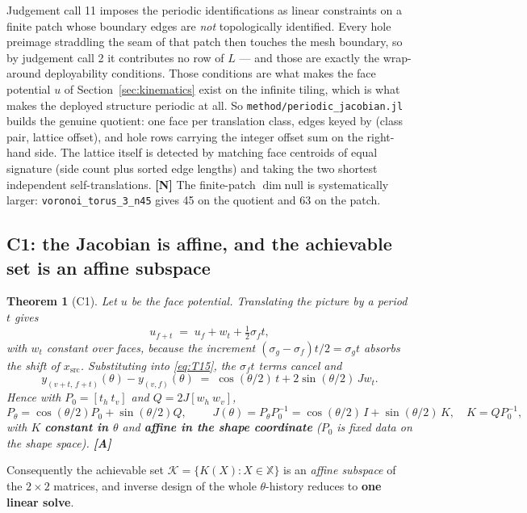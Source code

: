 \documentclass[11pt,a4paper]{article}
\newtheorem{theorem}{Theorem}[section]
\theoremstyle{definition}
\newcommand{\file}[1]{\texttt{\small #1}}
\begin{document}
Judgement call 11 imposes the periodic identifications as linear constraints on a finite patch
whose boundary edges are \emph{not} topologically identified. Every hole preimage straddling
the seam of that patch then touches the mesh boundary, so by judgement call 2 it contributes
no row of $L$ --- and those are exactly the wrap-around deployability conditions. Those
conditions are what makes the face potential $u$ of Section~\ref{sec:kinematics} exist on the
infinite tiling, which is what makes the deployed structure periodic at all. So
\file{method/periodic\_jacobian.jl} builds the genuine quotient: one face per translation
class, edges keyed by (class pair, lattice offset), and hole rows carrying the integer offset
sum on the right-hand side. The lattice itself is detected by matching face centroids of equal
signature (side count plus sorted edge lengths) and taking the two shortest independent
self-translations. \textbf{[N]} The finite-patch $\dim\mathrm{null}$ is systematically larger:
\file{voronoi\_torus\_3\_n45} gives 45 on the quotient and 63 on the patch.

\subsection{C1: the Jacobian is affine, and the achievable set is an affine subspace}

\begin{theorem}[C1]
\label{thm:c1}
Let $u$ be the face potential. Translating the picture by a period $t$ gives
\[
u_{f+t} \;=\; u_f + w_t + \tfrac12\sigma_f t ,
\]
with $w_t$ \emph{constant over faces}, because the increment
$(\sigma_g-\sigma_f)t/2=\sigma_g t$ absorbs the shift of $x_{\mathrm{src}}$. Substituting into
\eqref{eq:T15}, the $\sigma_f t$ terms cancel and
\[
y_{(v+t,\,f+t)}(\theta) - y_{(v,f)}(\theta) \;=\; \cos(\theta/2)\,t + 2\sin(\theta/2)\,J w_t .
\]
Hence with $P_0=[t_h\ t_v]$ and $Q=2J[w_h\ w_v]$,
\begin{equation}
P_\theta = \cos(\theta/2)P_0 + \sin(\theta/2)Q,
\qquad
\boxed{\;J(\theta) = P_\theta P_0^{-1} = \cos(\theta/2)\,I + \sin(\theta/2)\,K,\quad K=QP_0^{-1},\;}
\label{eq:c1}
\end{equation}
with $K$ \textbf{constant in $\theta$} and \textbf{affine in the shape coordinate} ($P_0$ is
fixed data on the shape space). \textbf{[A]}
\end{theorem}

\noindent Consequently the achievable set $\mathcal{K}=\{K(X):X\in\mathbb{X}\}$ is an
\emph{affine subspace} of the $2\times2$ matrices, and inverse design of the whole
$\theta$-history reduces to \textbf{one linear solve}.
\end{document}
